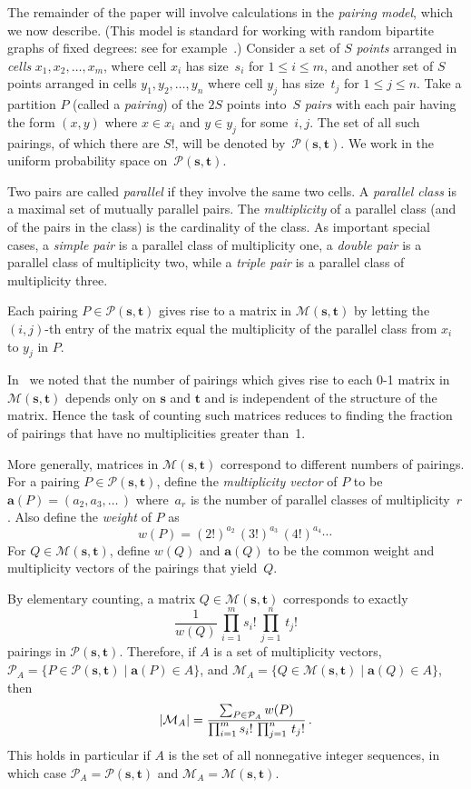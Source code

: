 \documentclass[12pt]{article}
\numberwithin{equation}{section}
\def\M{{\mathcal{M}}}
\def\P{{\mathcal{P}}}
\def\svec{{\boldsymbol{s}}}
\def\tvec{{\boldsymbol{t}}}
\def\avec{{\boldsymbol{a}}}
\def\Mst{{\M(\svec,\tvec)}}
\def\Pst{{\P(\svec,\tvec)}}
\begin{document}
The remainder of the paper will involve calculations in the
\emph{pairing model}, which we now describe.
(This model is standard for working with random bipartite
graphs of fixed degrees:  see for example~\cite{McK}.)
Consider a set of $S$ {\it points\/} arranged in {\it cells\/}
$x_1,x_2,\ldots,x_m$, where cell $x_i$ has size~$s_i$ for $1\leq i\leq m$,
and another set of $S$ points
arranged in cells $y_1,y_2,\ldots,y_n$ where cell $y_j$ has size~$t_j$
for $1\leq j\leq n$.
Take a partition $P$ (called a {\it pairing\/}) of the $2S$ points
into~$S$ {\it pairs\/} with each pair having the form $(x,y)$
where $x\in x_i$ and $y \in y_j$ for some~$i,j$.
The set of all such pairings, of which there are $S!$,
will be denoted by~$\Pst$.
We work in the uniform probability space on~$\Pst$.

Two pairs are called \textit{parallel\/} if they involve the same
two cells.
A \textit{parallel class\/} is a maximal set of mutually
parallel pairs.
The \textit{multiplicity\/} of a parallel class (and of the
pairs in the class) is the cardinality of the class.
As important special cases,
a \textit{simple pair\/} is a parallel class of multiplicity one,
a \textit{double pair\/} is a parallel class of multiplicity two,
while a \textit{triple pair\/} is a parallel class of multiplicity
three.

Each pairing $P\in\Pst$ gives rise to a matrix
in $\Mst$ by letting the $(i,j)$-th entry of the matrix equal
the multiplicity of the parallel class from $x_i$ to $y_j$ in $P$. 

In~\cite{GMW} we noted that the number of pairings which gives
rise to each 0-1 matrix in $\Mst$ 
depends only on $\svec$ and $\tvec$ and is independent of the
structure of the matrix.  Hence the task of counting such
matrices reduces to finding the fraction of pairings that
have no multiplicities greater than~1.

More generally, matrices in $\Mst$ correspond to different
numbers of pairings.
For a pairing $P\in\Pst$, define the \textit{multiplicity vector\/}
of $P$ to be $\avec(P)=(a_2,a_3,\ldots\,)$
where~$a_r$ is the number of parallel classes of multiplicity~$r$.
Also define the \textit{weight} of $P$ as 
\[ w(P) = (2!)^{a_2} \,(3!)^{a_3} \,(4!)^{a_4}\cdots\, \]
For $Q\in\Mst$, define $w(Q)$ and $\avec(Q)$ to be the common
weight and multiplicity vectors of the pairings that yield~$Q$.

By elementary counting, a matrix $Q\in\Mst$ corresponds
to exactly
\[ \frac{1}{w(Q)}\, \prod_{i=1}^m s_i!\, 
 \prod_{j=1}^n \,t_j!\]
pairings in $\Pst$.
Therefore, if $A$ is a set of multiplicity vectors,
$\P_A=\{P\in\Pst\mid \avec(P)\in A\}$, and
$\M_A=\{Q\in\Mst\mid \avec(Q)\in A\}$, then
\begin{equation}\label{meM}
  \card{\M_A} = \frac{\sum_{P\in\P_A} w(P)}
   {\prod_{i=1}^m s_i!\,\prod_{j=1}^n \,t_j!}\,.
\end{equation}
This holds in particular if $A$ is the set of all nonnegative 
integer sequences, in which case $\P_A=\Pst$ and $\M_A=\Mst$.
\end{document}
